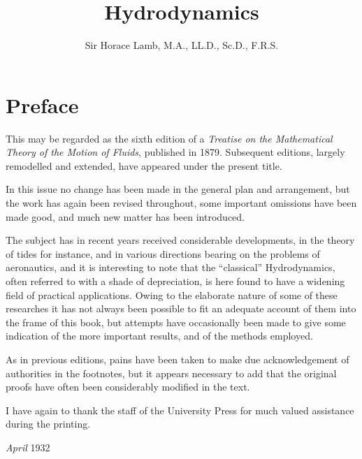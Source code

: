 \documentclass[twoside, openany]{book}
\numberwithin{equation}{article} %
\begin{document}
\frontmatter


\title{Hydrodynamics}\author{Sir Horace Lamb, M.A., LL.D., Sc.D., F.R.S.}
\date{}
\maketitle
\clearpage{\pagestyle{empty}\cleardoublepage}

\chapter*{Preface}

This may be regarded as the sixth edition of a \emph{Treatise on the Mathematical Theory of the Motion of Fluids}, published in 1879. Subsequent editions, largely remodelled and extended, have appeared under the present title.

In this issue no change has been made in the general plan and arrangement, but the work has again been revised throughout, some important omissions have been made good, and much new matter has been introduced.

The subject has in recent years received considerable developments, in the theory of tides for instance, and in various directions bearing on the problems of aeronautics, and it is interesting to note that the ``classical'' Hydrodynamics, often referred to with a shade of depreciation, is here found to have a widening field of practical applications. Owing to the elaborate nature of some of these researches it has not always been possible to fit an adequate account of them into the frame of this book, but attempts have occasionally been made to give some indication of the more important results, and of the methods employed.

As in previous editions, pains have been taken to make due acknowledgement of authorities in the footnotes, but it appears necessary to add that the original proofs have often been considerably modified in the text.

I have again to thank the staff of the University Press for much valued assistance during the printing.


\noindent \emph{April} 1932

\clearpage{\pagestyle{empty}\cleardoublepage}
\end{document}

